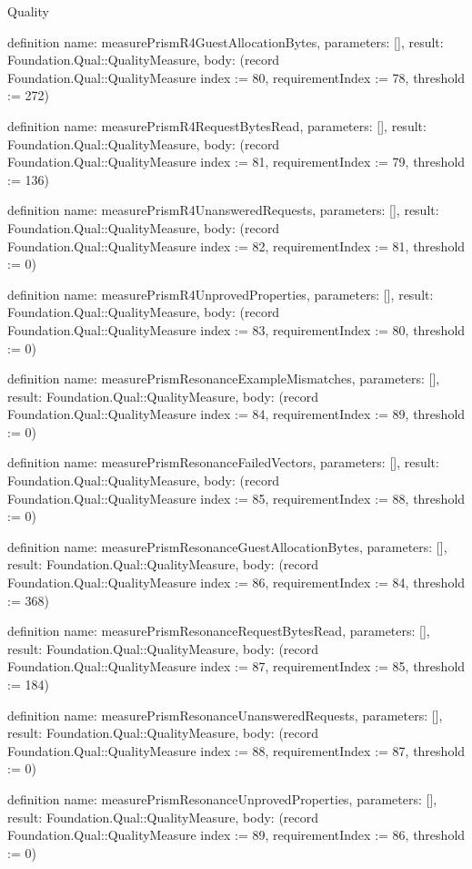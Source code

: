 \begin{lexlean}{Quality}
\begin{semanticmodule}
definition{
  name: measurePrismR4GuestAllocationBytes,
  parameters: [],
  result: Foundation.Qual::QualityMeasure,
  body: (record Foundation.Qual::QualityMeasure {index := 80, requirementIndex := 78, threshold := 272})
}

definition{
  name: measurePrismR4RequestBytesRead,
  parameters: [],
  result: Foundation.Qual::QualityMeasure,
  body: (record Foundation.Qual::QualityMeasure {index := 81, requirementIndex := 79, threshold := 136})
}

definition{
  name: measurePrismR4UnansweredRequests,
  parameters: [],
  result: Foundation.Qual::QualityMeasure,
  body: (record Foundation.Qual::QualityMeasure {index := 82, requirementIndex := 81, threshold := 0})
}

definition{
  name: measurePrismR4UnprovedProperties,
  parameters: [],
  result: Foundation.Qual::QualityMeasure,
  body: (record Foundation.Qual::QualityMeasure {index := 83, requirementIndex := 80, threshold := 0})
}

definition{
  name: measurePrismResonanceExampleMismatches,
  parameters: [],
  result: Foundation.Qual::QualityMeasure,
  body: (record Foundation.Qual::QualityMeasure {index := 84, requirementIndex := 89, threshold := 0})
}

definition{
  name: measurePrismResonanceFailedVectors,
  parameters: [],
  result: Foundation.Qual::QualityMeasure,
  body: (record Foundation.Qual::QualityMeasure {index := 85, requirementIndex := 88, threshold := 0})
}

definition{
  name: measurePrismResonanceGuestAllocationBytes,
  parameters: [],
  result: Foundation.Qual::QualityMeasure,
  body: (record Foundation.Qual::QualityMeasure {index := 86, requirementIndex := 84, threshold := 368})
}

definition{
  name: measurePrismResonanceRequestBytesRead,
  parameters: [],
  result: Foundation.Qual::QualityMeasure,
  body: (record Foundation.Qual::QualityMeasure {index := 87, requirementIndex := 85, threshold := 184})
}

definition{
  name: measurePrismResonanceUnansweredRequests,
  parameters: [],
  result: Foundation.Qual::QualityMeasure,
  body: (record Foundation.Qual::QualityMeasure {index := 88, requirementIndex := 87, threshold := 0})
}

definition{
  name: measurePrismResonanceUnprovedProperties,
  parameters: [],
  result: Foundation.Qual::QualityMeasure,
  body: (record Foundation.Qual::QualityMeasure {index := 89, requirementIndex := 86, threshold := 0})
}


\end{semanticmodule}
\end{lexlean}
